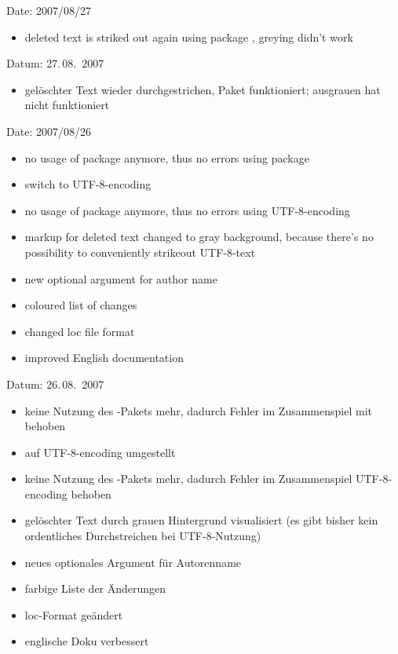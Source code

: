 
\ifENGLISH
 Date: 2007/08/27
 \begin{itemize}
	\item deleted text is striked out again using package , greying didn't work
 \end{itemize}
\fi
	\ifGERMAN
	 Datum: 27.\,08.~2007
	 \begin{itemize}
		\item gelöschter Text wieder durchgestrichen, Paket  funktioniert; ausgrauen hat nicht funktioniert
	 \end{itemize}
	\fi


\ifENGLISH
 Date: 2007/08/26
 \begin{itemize}
	\item no usage of package  anymore, thus no errors using package 
	\item switch to UTF-8-encoding
	\item no usage of package  anymore, thus no errors using UTF-8-encoding
	\item markup for deleted text changed to gray background, because there's no possibility to conveniently strikeout UTF-8-text
	\item new optional argument for author name
	\item coloured list of changes
	\item changed loc file format
	\item improved English documentation
 \end{itemize}
\fi
	\ifGERMAN
	 Datum: 26.\,08.~2007
	 \begin{itemize}
		\item keine Nutzung des -Pakets mehr, dadurch Fehler im Zusammenspiel mit  behoben
		\item auf UTF-8-encoding umgestellt
		\item keine Nutzung des -Pakets mehr, dadurch Fehler im Zusammenspiel UTF-8-encoding behoben
		\item gelöschter Text durch grauen Hintergrund visualisiert (es gibt bisher kein ordentliches Durchstreichen bei UTF-8-Nutzung)
		\item neues optionales Argument für Autorenname
		\item farbige Liste der Änderungen
		\item loc-Format geändert
		\item englische Doku verbessert
	 \end{itemize}
	\fi

